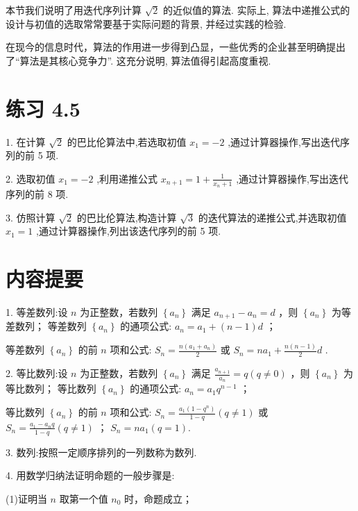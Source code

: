\documentclass[10pt]{article}
\begin{document}
本节我们说明了用迭代序列计算 \(\sqrt{2}\) 的近似值的算法. 实际上, 算法中递推公式的设计与初值的选取常常要基于实际问题的背景, 并经过实践的检验.

在现今的信息时代，算法的作用进一步得到凸显，一些优秀的企业甚至明确提出了“算法是其核心竞争力”. 这充分说明, 算法值得引起高度重视.

\section*{练习 4.5}

1. 在计算 \(\sqrt{2}\) 的巴比伦算法中,若选取初值 \({x}_{1} =  - 2\) ,通过计算器操作,写出迭代序列的前 5 项.

2. 选取初值 \({x}_{1} =  - 2\) ,利用递推公式 \({x}_{n + 1} = 1 + \frac{1}{{x}_{n} + 1}\) ,通过计算器操作,写出迭代序列的前 8 项.

3. 仿照计算 \(\sqrt{2}\) 的巴比伦算法,构造计算 \(\sqrt{3}\) 的迭代算法的递推公式,并选取初值 \({x}_{1} = 1\) ,通过计算器操作,列出该迭代序列的前 5 项.

\section*{内容提要}

1. 等差数列:设 \(n\) 为正整数，若数列 \(\left\{  {a}_{n}\right\}\) 满足 \({a}_{n + 1} - {a}_{n} = d\) ，则 \(\left\{  {a}_{n}\right\}\) 为等差数列； 等差数列 \(\left\{  {a}_{n}\right\}\) 的通项公式: \({a}_{n} = {a}_{1} + \left( {n - 1}\right) d\) ；

等差数列 \(\left\{  {a}_{n}\right\}\) 的前 \(n\) 项和公式: \({S}_{n} = \frac{n\left( {{a}_{1} + {a}_{n}}\right) }{2}\) 或 \({S}_{n} = n{a}_{1} + \frac{n\left( {n - 1}\right) }{2}d\) .

2. 等比数列:设 \(n\) 为正整数，若数列 \(\left\{  {a}_{n}\right\}\) 满足 \(\frac{{a}_{n + 1}}{{a}_{n}} = q\left( {q \neq  0}\right)\) ，则 \(\left\{  {a}_{n}\right\}\) 为等比数列； 等比数列 \(\left\{  {a}_{n}\right\}\) 的通项公式: \({a}_{n} = {a}_{1}{q}^{n - 1}\) ；

等比数列 \(\left\{  {a}_{n}\right\}\) 的前 \(n\) 项和公式: \({S}_{n} = \frac{{a}_{1}\left( {1 - {q}^{n}}\right) }{1 - q}\left( {q \neq  1}\right)\) 或 \({S}_{n} = \frac{{a}_{1} - {a}_{n}q}{1 - q}\left( {q \neq  1}\right)\) ； \({S}_{n} = n{a}_{1}\left( {q = 1}\right) .\)

3. 数列:按照一定顺序排列的一列数称为数列.

4. 用数学归纳法证明命题的一般步骤是:

(1)证明当 \(n\) 取第一个值 \({n}_{0}\) 时，命题成立；
\end{document}
